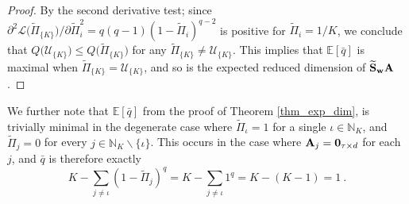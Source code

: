 \documentclass[journal,letterpaper,onecolumn,twoside,nofonttune]{IEEEtran}
\newcommand{\N}{\mathbb{N}}
\newcommand{\E}{\mathbb{E}}
\newcommand{\lag}{\mathscr{L}}
\newcommand{\Uu}{\mathcal{U}}
\newcommand{\qbar}{\bar{q}}
\newcommand{\Ab}{\bold{A}}
\newcommand{\Sb}{\bold{S}}
\newcommand{\Sbwt}{\widetilde{\Sb}}
\newcommand{\Sbw}{\Sbwt_{\wb}}
\newcommand{\wb}{\bold{w}}
\newcommand{\Pit}{\tilde{\Pi}}
\begin{document}
\begin{proof}
By the second derivative test; since $\partial^2\lag\big(\Pit_{\{K\}}\big)\big/\partial\Pit_i^2 = q(q-1)(1-\Pit_i)^{q-2}$ is positive for $\Pit_i=1/K$, we conclude that $Q\big(\Uu_{\{K\}}\big)\leqslant Q\big(\Pit_{\{K\}}\big)$ for any $\Pit_{\{K\}}\neq\Uu_{\{K\}}$. This implies that $\E[\qbar]$ is maximal when $\Pit_{\{K\}}=\Uu_{\{K\}}$, and so is the expected reduced dimension of $\Sbw\Ab$.
\end{proof}

We further note that $\E[\qbar]$ from the proof of Theorem \ref{thm_exp_dim}, is trivially minimal in the degenerate case where $\Pit_\iota=1$ for a single $\iota\in\N_{K}$, and $\Pit_j=0$ for every $j\in\N_{K}\backslash\{\iota\}$. This occurs in the case where $\Ab_j=\bold{0}_{\tau\times d}$ for each $j$, and $\qbar$ is therefore exactly
$$ K-\sum_{j\neq\iota}(1-\Pit_j)^q = K-\sum_{j\neq\iota}1^q = K-(K-1) = 1\ . $$
\end{document}
